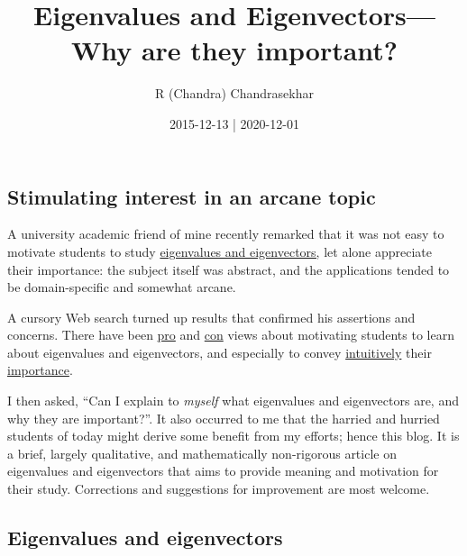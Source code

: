 \documentclass[
  11pt,
  british,
  a4paper,
]{article}
\title{Eigenvalues and Eigenvectors---Why are they important?}
\author{R (Chandra) Chandrasekhar}
\date{2015-12-13 | 2020-12-01}
\begin{document}
\maketitle

\thispagestyle{empty}


\hypertarget{stimulating-interest-in-an-arcane-topic}{%
\subsection{Stimulating interest in an arcane
topic}\label{stimulating-interest-in-an-arcane-topic}}

A university academic friend of mine recently remarked that it was not
easy to motivate students to study
\href{https://en.wikipedia.org/wiki/Eigenvalues_and_eigenvectors}{eigenvalues
and eigenvectors,} let alone appreciate their importance: the subject
itself was abstract, and the applications tended to be domain-specific
and somewhat arcane.

A cursory Web search turned up results that confirmed his assertions and
concerns. There have been
\href{http://matheducators.stackexchange.com/questions/520/what-is-a-good-motivation-showcase-for-a-student-for-the-study-of-eigenvalues}{pro}
and
\href{http://matheducators.stackexchange.com/questions/8586/too-much-motivation}{con}
views about motivating students to learn about eigenvalues and
eigenvectors, and especially to convey
\href{http://matheducators.stackexchange.com/questions/3983/what-is-the-best-way-to-intuitively-explain-what-eigenvectors-and-eigenvalues-ar}{intuitively}
their
\href{http://math.stackexchange.com/questions/23312/what-is-the-importance-of-eigenvalues-eigenvectors}{importance}.

I then asked, ``Can I explain to \emph{myself} what eigenvalues and
eigenvectors are, and why they are important?''. It also occurred to me
that the harried and hurried students of today might derive some benefit
from my efforts; hence this blog. It is a brief, largely qualitative,
and mathematically non-rigorous article on eigenvalues and eigenvectors
that aims to provide meaning and motivation for their study. Corrections
and suggestions for improvement are most welcome. 
\normalfont

\hypertarget{eigenvalues-and-eigenvectors}{%
\subsection{Eigenvalues and
eigenvectors}\label{eigenvalues-and-eigenvectors}}
\end{document}
